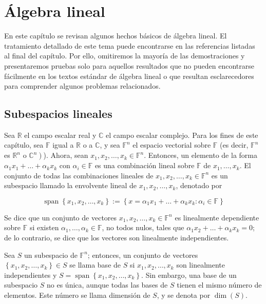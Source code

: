 \chapter{Álgebra lineal}

En este capítulo se revisan algunos hechos básicos de álgebra lineal. El tratamiento detallado de este tema puede encontrarse en las referencias listadas al final del capítulo. Por ello, omitiremos la mayoría de las demostraciones y presentaremos pruebas solo para aquellos resultados que no pueden encontrarse fácilmente en los textos estándar de álgebra lineal o que resultan esclarecedores para comprender algunos problemas relacionados.

\section{Subespacios lineales}
Sea $\mathbb{R}$ el campo escalar real y $\mathbb{C}$ el campo escalar complejo. Para los fines de este capítulo, sea $\mathbb{F}$ igual a $\mathbb{R}$ o a $\mathbb{C}$, y sea $\mathbb{F}^{n}$ el espacio vectorial sobre $\mathbb{F}$ (es decir, $\mathbb{F}^{n}$ es $\mathbb{R}^{n}$ o $\left.\mathbb{C}^{n}\right)$). Ahora, sean $x_{1}, x_{2}, \ldots, x_{k} \in \mathbb{F}^{n}$. Entonces, un elemento de la forma $\alpha_{1} x_{1}+\ldots+\alpha_{k} x_{k}$ con $\alpha_{i} \in \mathbb{F}$ es una combinación lineal sobre $\mathbb{F}$ de $x_{1}, \ldots, x_{k}$. El conjunto de todas las combinaciones lineales de $x_{1}, x_{2}, \ldots, x_{k} \in \mathbb{F}^{n}$ es un subespacio llamado la envolvente lineal de $x_{1}, x_{2}, \ldots, x_{k}$, denotado por

$$
\operatorname{span}\left\{x_{1}, x_{2}, \ldots, x_{k}\right\}:=\left\{x=\alpha_{1} x_{1}+\ldots+\alpha_{k} x_{k}: \alpha_{i} \in \mathbb{F}\right\}
$$

Se dice que un conjunto de vectores $x_{1}, x_{2}, \ldots, x_{k} \in \mathbb{F}^{n}$ es linealmente dependiente sobre $\mathbb{F}$ si existen $\alpha_{1}, \ldots, \alpha_{k} \in \mathbb{F}$, no todos nulos, tales que $\alpha_{1} x_{2}+\ldots+\alpha_{k} x_{k}=0$; de lo contrario, se dice que los vectores son linealmente independientes.

Sea $S$ un subespacio de $\mathbb{F}^{n}$; entonces, un conjunto de vectores $\left\{x_{1}, x_{2}, \ldots, x_{k}\right\} \in S$ se llama base de $S$ si $x_{1}, x_{2}, \ldots, x_{k}$ son linealmente independientes y $S=\operatorname{span}\left\{x_{1}, x_{2}, \ldots, x_{k}\right\}$. Sin embargo, una base de un subespacio $S$ no es única, aunque todas las bases de $S$ tienen el mismo número de elementos. Este número se llama dimensión de $S$, y se denota por $\operatorname{dim}(S)$.

